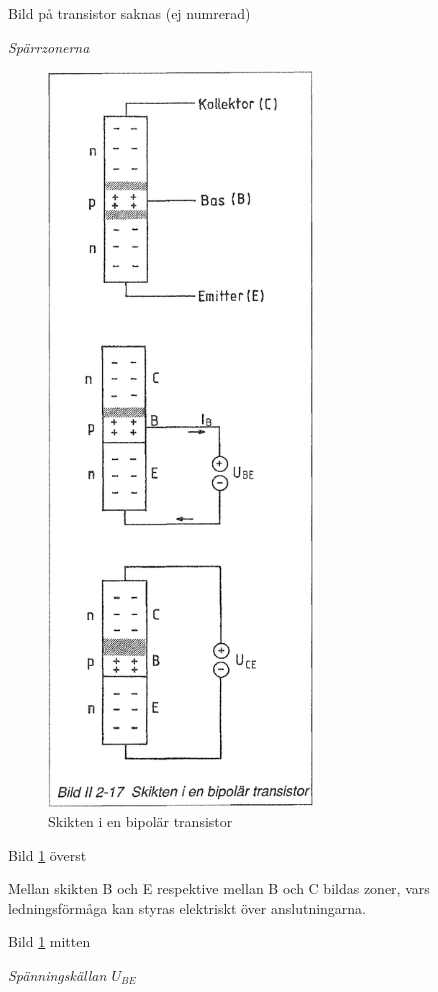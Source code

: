 Bild på transistor saknas (ej numrerad)

\emph{Spärrzonerna}

\begin{figure}[h]
\begin{center}
\includegraphics[width=7cm]{images/bild_2_2-17}
\caption{Skikten i en bipolär transistor}
\label{fig:BildII2-17}
\end{center}
\end{figure}

Bild \ref{fig:BildII2-17} överst

Mellan skikten B och E respektive mellan B och C bildas zoner, vars
ledningsförmåga kan styras elektriskt över anslutningarna.

Bild \ref{fig:BildII2-17} mitten

\emph{Spänningskällan \(U_{BE}\)}

